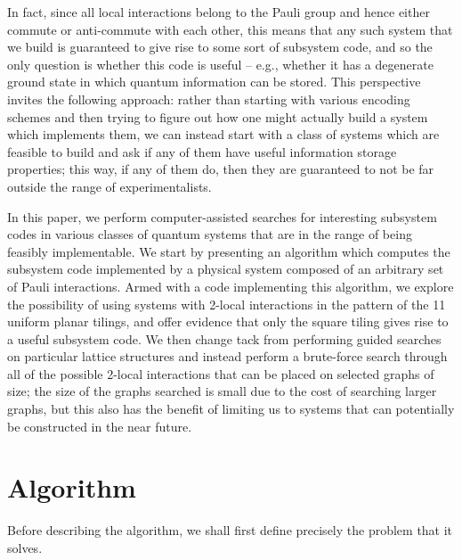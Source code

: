 \documentclass[twocolumn,showpacs,preprintnumbers,amsmath,amssymb,nofootinbib,pra,floatfix]{revtex4}
\begin{document}
In fact, since all local interactions belong to the Pauli group and hence either commute or anti-commute with each other, this means that any such system that we build is guaranteed to give rise to some sort of subsystem code, and so the only question is whether this code is useful -- e.g., whether it has a degenerate ground state in which quantum information can be stored.  This perspective invites the following approach:  rather than starting with various encoding schemes and then trying to figure out how one might actually build a system which implements them, we can instead start with a class of systems which are feasible to build and ask if any of them have useful information storage properties;  this way, if any of them do, then they are guaranteed to not be far outside the range of experimentalists. 

In this paper, we perform computer-assisted searches for interesting subsystem codes in various classes of quantum systems that are in the range of being feasibly implementable.  We start by presenting an algorithm which computes the subsystem code implemented by a physical system composed of an arbitrary set of Pauli interactions.  Armed with a code implementing this algorithm, we explore the possibility of using systems with 2-local interactions in the pattern of the 11 uniform planar tilings, and offer evidence that only the square tiling gives rise to a useful subsystem code.  We then change tack from performing guided searches on particular lattice structures and instead perform a brute-force search through all of the possible 2-local interactions that can be placed on selected graphs of  size; the size of the graphs searched is small due to the cost of searching larger graphs, but this also has the benefit of limiting us to systems that can potentially be constructed in the near future.
\section{Algorithm}

Before describing the algorithm, we shall first define precisely the problem that it solves.
\end{document}
